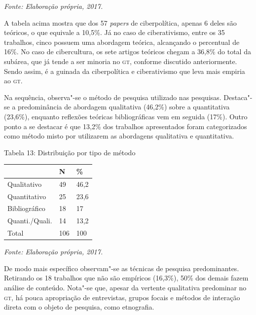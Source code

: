 \begin{center}
{\footnotesize\emph{Fonte: Elaboração própria, 2017.}}
\end{center}

A tabela acima mostra que dos 57 \emph{papers} de ciberpolítica, apenas
6 deles são teóricos, o que equivale a 10,5\%. Já no caso de
ciberativismo, entre os 35 trabalhos, cinco possuem uma abordagem
teórica, alcançando o percentual de 16\%. No caso de cibercultura, os
sete artigos teóricos chegam a 36,8\% do total da subárea, que já tende
a ser minoria no \textsc{gt}, conforme discutido anteriormente. Sendo assim, é a
guinada da ciberpolítica e ciberativismo que leva mais empiria ao \textsc{gt}.

Na sequência, observa"-se o método de pesquisa utilizado nas pesquisas.
Destaca"-se a predominância de abordagem qualitativa (46,2\%) sobre a
quantitativa (23,6\%), enquanto reflexões teóricas bibliográficas vem em
seguida (17\%). Outro ponto a se destacar é que 13,2\% dos trabalhos
apresentados foram categorizados como método misto por utilizarem as
abordagens qualitativa e quantitativa.

\begin{center}
Tabela 13: Distribuição por tipo de método
\end{center}

\begin{center}
\centering
\begin{tabular}{|l|l|l|}
\hline
 & \textbf{N} & \textbf{\%} \\ \hline
Qualitativo & 49 & 46,2 \\ \hline
Quantitativo & 25 & 23,6 \\ \hline
Bibliográfico & 18 & 17 \\ \hline
Quanti./Quali. & 14 & 13,2 \\ \hline
Total & 106 & 100 \\ \hline
\end{tabular}
\end{center}

\begin{center}
{\footnotesize\emph{Fonte: Elaboração própria, 2017.}}
\end{center}

De modo mais específico observam"-se as técnicas de pesquisa
predominantes. Retirando os 18 trabalhos que não são empíricos (16,3\%),
50\% dos demais fazem análise de conteúdo. Nota"-se que, apesar da
vertente qualitativa predominar no \textsc{gt}, há pouca apropriação de
entrevistas, grupos focais e métodos de interação direta com o objeto de
pesquisa, como etnografia.

